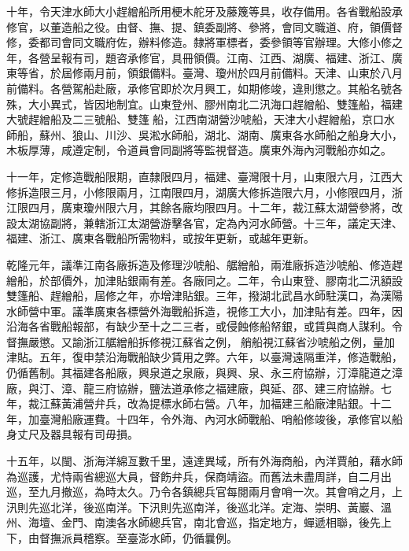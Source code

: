 \begin{pinyinscope}
十年，令天津水師大小趕繒船所用梗木舵牙及藤篾等具，收存備用。各省戰船設承修官，以董造船之役。由督、撫、提、鎮委副將、參將，會同文職道、府，領價督修，委都司會同文職府佐，辦料修造。隸將軍標者，委參領等官辦理。大修小修之年，各營呈報有司，題咨承修官，具冊領價。江南、江西、湖廣、福建、浙江、廣東等省，於屆修兩月前，領銀備料。臺灣、瓊州於四月前備料。天津、山東於八月前備料。各營駕船赴廠，承修官即於次月興工，如期修竣，違則懲之。其船名號各殊，大小異式，皆因地制宜。山東登州、膠州南北二汛海口趕繒船、雙篷船，福建大號趕繒船及二三號船、雙篷船，江西南湖營沙唬船，天津大小趕繒船，京口水師船，蘇州、狼山、川沙、吳淞水師船，湖北、湖南、廣東各水師船之船身大小，木板厚薄，咸遵定制，令道員會同副將等監視督造。廣東外海內河戰船亦如之。

十一年，定修造戰船限期，直隸限四月，福建、臺灣限十月，山東限六月，江西大修拆造限三月，小修限兩月，江南限四月，湖廣大修拆造限六月，小修限四月，浙江限四月，廣東瓊州限六月，其餘各廠均限四月。十二年，裁江蘇太湖營參將，改設太湖協副將，兼轄浙江太湖營游擊各官，定為內河水師營。十三年，議定天津、福建、浙江、廣東各戰船所需物料，或按年更新，或越年更新。

乾隆元年，議準江南各廠拆造及修理沙唬船、艍繒船，兩淮廠拆造沙唬船、修造趕繒船，於部價外，加津貼銀兩有差。各廠同之。二年，令山東登、膠南北二汛額設雙篷船、趕繒船，屆修之年，亦增津貼銀。三年，撥湖北武昌水師駐漢口，為漢陽水師營中軍。議準廣東各標營外海戰船拆造，視修工大小，加津貼有差。四年，因沿海各省戰船報部，有缺少至十之二三者，或侵蝕修船帑銀，或賃與商人謀利。令督撫嚴懲。又諭浙江艍繒船拆修視江蘇省之例，艄船視江蘇省沙唬船之例，量加津貼。五年，復申禁沿海戰船缺少賃用之弊。六年，以臺灣遠隔重洋，修造戰船，仍循舊制。其福建各船廠，興泉道之泉廠，與興、泉、永三府協辦，汀漳龍道之漳廠，與汀、漳、龍三府協辦，鹽法道承修之福建廠，與延、邵、建三府協辦。七年，裁江蘇黃浦營弁兵，改為提標水師右營。八年，加福建三船廠津貼銀。十二年，加臺灣船廠運費。十四年，令外海、內河水師戰船、哨船修竣後，承修官以船身丈尺及器具報有司毋損。

十五年，以閩、浙海洋綿亙數千里，遠達異域，所有外海商船，內洋賈舶，藉水師為巡護，尤恃兩省總巡大員，督飭弁兵，保商靖盜。而舊法未盡周詳，自二月出巡，至九月撤巡，為時太久。乃令各鎮總兵官每閱兩月會哨一次。其會哨之月，上汛則先巡北洋，後巡南洋。下汛則先巡南洋，後巡北洋。定海、崇明、黃巖、溫州、海壇、金門、南澳各水師總兵官，南北會巡，指定地方，蟬遞相聯，後先上下，由督撫派員稽察。至臺澎水師，仍循曩例。


\end{pinyinscope}
